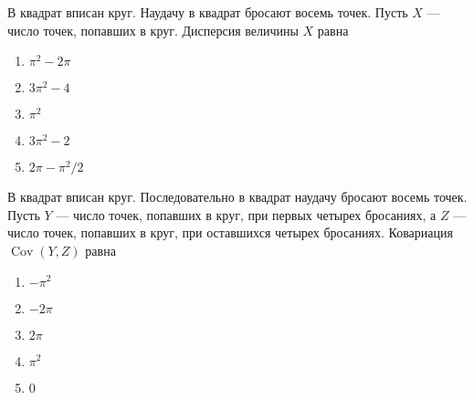 \documentclass[t]{beamer}
\DeclareMathOperator{\Cov}{Cov}
\begin{document}
 \begin{frame} \label{9} 
\begin{block}{9} 

В квадрат вписан круг. Наудачу в квадрат бросают восемь точек. Пусть $X$ — число точек, попавших в круг. Дисперсия величины $X$ равна     


 \end{block} 
\begin{enumerate} 
\item[] \hyperlink{9-No}{\beamergotobutton{} $\pi^2 - 2 \pi$}
\item[] \hyperlink{9-No}{\beamergotobutton{} $3\pi^2 - 4$}
\item[] \hyperlink{9-No}{\beamergotobutton{} $\pi^2$}
\item[] \hyperlink{9-No}{\beamergotobutton{} $3\pi^2 - 2$
}
\item[] \hyperlink{9-Yes}{\beamergotobutton{} $2\pi - \pi^2 / 2$}
\end{enumerate} 
\end{frame} 


 \begin{frame} \label{10} 
\begin{block}{10} 

В квадрат вписан круг. Последовательно в квадрат наудачу бросают восемь точек. Пусть $Y$ — число точек, попавших в круг, при первых четырех бросаниях, а $Z$ — число точек, попавших в круг, при оставшихся четырех бросаниях. Ковариация $\Cov(Y,Z)$ равна
     


 \end{block} 
\begin{enumerate} 
\item[] \hyperlink{10-No}{\beamergotobutton{} $-\pi^2$}
\item[] \hyperlink{10-No}{\beamergotobutton{} $-2\pi$
}
\item[] \hyperlink{10-No}{\beamergotobutton{} $2\pi$}
\item[] \hyperlink{10-No}{\beamergotobutton{} $\pi^2$}
\item[] \hyperlink{10-Yes}{\beamergotobutton{} $0$}
\end{enumerate} 
\end{frame} 
\end{document}
